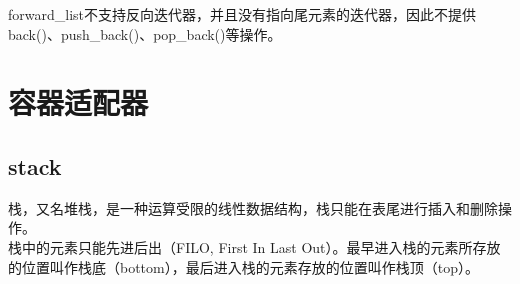 forward\_list不支持反向迭代器，并且没有指向尾元素的迭代器，因此不提供back()、push\_back()、pop\_back()等操作。

\newpage

\section{容器适配器}

\subsection{stack}

栈，又名堆栈，是一种运算受限的线性数据结构，栈只能在表尾进行插入和删除操作。 \\

栈中的元素只能先进后出（FILO, First In Last Out）。最早进入栈的元素所存放的位置叫作栈底（bottom），最后进入栈的元素存放的位置叫作栈顶（top）。 \\

